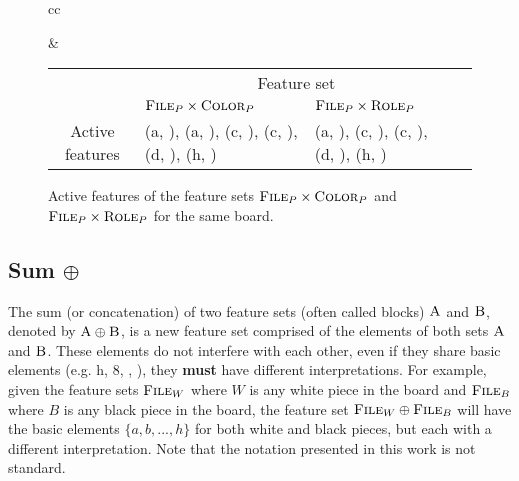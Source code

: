 \begin{figure}[H]
\centering

\begin{tabular}{cc}
\raisebox{-7ex}{
\chessboard[
    tinyboard,
    showmover=false,
    hlabel=false,
    setwhite={kc3, nc2, pa2, Pd4},
    addblack={Kc8,bh7, pa7}
]
}

&

\begin{tabular}{|c|p{4cm}|p{4cm}|p{0cm}}
\cline{2-3}
\multicolumn{1}{c|}{} & \multicolumn{2}{c|}{\centering Feature set} \\
\cline{2-3}
\multicolumn{1}{c|}{} & \centering $\textsc{File}_{P} \times \textsc{Color}_{P}$ & \centering $\textsc{File}_{P} \times \textsc{Role}_{P}$ & \\
\cline{1-3}
Active features &
(a, \white), (a, \black), (c, \black), (c, \white), (d, \white), (h, \black) &
(a, \sympawn), (c, \symking), (c, \symknight), (d, \sympawn), (h, \symbishop) \\
\cline{1-3}
\end{tabular}

\end{tabular}

\caption{Active features of the feature sets $\textsc{File}_{P} \times \textsc{Color}_{P}$ and $\textsc{File}_{P} \times \textsc{Role}_{P}$ for the same board.}
\label{fig:active_features}
\end{figure}


\subsection{Sum $\oplus$}


The sum (or concatenation) of two feature sets (often called blocks) $\textsc{A}$ and $\textsc{B}$, denoted by $\textsc{A} \oplus \textsc{B}$, is a new feature set comprised of the elements of both sets $\textsc{A}$ and $\textsc{B}$. These elements do not interfere with each other, even if they share basic elements (e.g. h, 8, \symrook, \black), they \textbf{must} have different interpretations.
For example, given the feature sets $\textsc{File}_{W}$ where $W$ is any white piece in the board and $\textsc{File}_{B}$ where $B$ is any black piece in the board, the feature set $\textsc{File}_{W} \oplus \textsc{File}_{B}$ will have the basic elements $\{a, b, ..., h\}$ for both white and black pieces, but each with a different interpretation. Note that the notation presented in this work is not standard.

